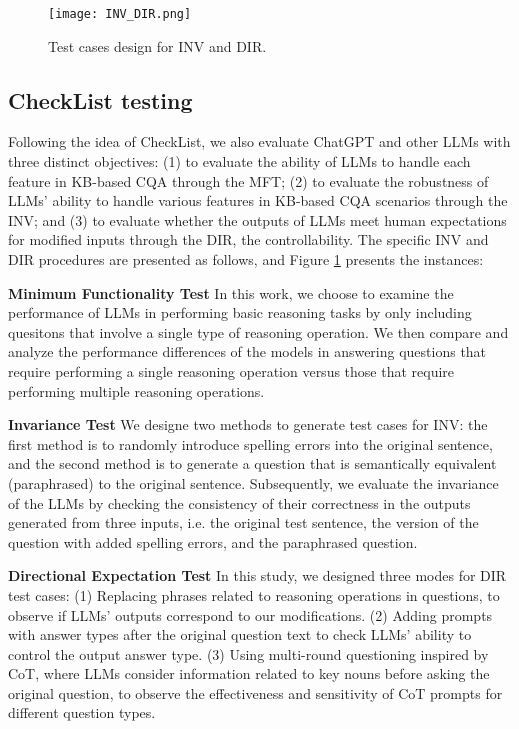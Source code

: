 \documentclass[runningheads]{llncs}
\begin{document}
\begin{figure}[t] \centering
\texttt{[image: INV\_DIR.png]}
\caption{Test cases design for INV and DIR.} \label{fig4}
\end{figure}

\subsection{CheckList testing}
Following the idea of CheckList, we also evaluate ChatGPT and other LLMs with three distinct objectives: (1) to evaluate the ability of LLMs to handle each feature in KB-based CQA through the MFT; (2) to evaluate the robustness of LLMs’ ability to handle various features in KB-based CQA scenarios through the INV; and (3) to evaluate whether the outputs of LLMs meet human expectations for modified inputs through the DIR, the controllability. 
The specific INV and DIR procedures are presented as follows, and Figure \ref{fig4} presents the instances:

\textbf{Minimum Functionality Test} In this work, we choose to examine the performance of LLMs in performing basic reasoning tasks by only including quesitons that involve a single type of reasoning operation. We then compare and analyze the performance differences of the models in answering questions that require performing a single reasoning operation versus those that require performing multiple reasoning operations.

\textbf{Invariance Test} We designe two methods to generate test cases for INV: the first method is to randomly introduce spelling errors into the original sentence, and the second method is to generate a question that is semantically equivalent (paraphrased) to the original sentence. Subsequently, we evaluate the invariance of the LLMs by checking the consistency of their correctness in the outputs generated from three inputs, i.e. the original test sentence, the version of the question with added spelling errors, and the paraphrased question.

\textbf{Directional Expectation Test}
In this study, we designed three modes for DIR test cases: (1) Replacing phrases related to reasoning operations in questions, to observe if LLMs' outputs correspond to our modifications. (2) Adding prompts with answer types after the original question text to check LLMs' ability to control the output answer type. (3) Using multi-round questioning inspired by CoT, where LLMs consider information related to key nouns before asking the original question, to observe the effectiveness and sensitivity of CoT prompts for different question types.
\end{document}
